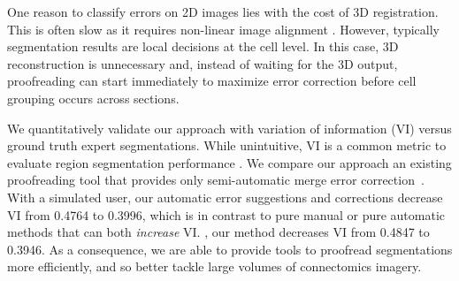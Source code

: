 
 One reason to classify errors on 2D images lies with the cost of 3D registration. This is often slow as it requires non-linear image alignment \cite{akselrod09,Saalfeld2010Asrigidaspossible}. However, typically segmentation results are local decisions at the cell level. In this case, 3D reconstruction is unnecessary and, instead of waiting for the 3D output, proofreading can start immediately to maximize error correction before cell grouping occurs across sections.

We quantitatively validate our approach with variation of information (VI) versus ground truth expert segmentations. While unintuitive, VI is a common metric to evaluate region segmentation performance \cite{NunezIglesias2013Machine}. We compare our approach  an existing proofreading tool that provides only semi-automatic merge error correction~\cite{haehn_dojo_2014}. With a simulated user, our automatic error suggestions and corrections decrease VI from 0.4764 to 0.3996, which is in contrast to pure manual or pure automatic methods that can both \emph{increase} VI. , our method decreases VI from 0.4847 to 0.3946. As a consequence, we are able to provide tools to proofread segmentations more efficiently, and so better tackle large volumes of connectomics imagery.

%
%
